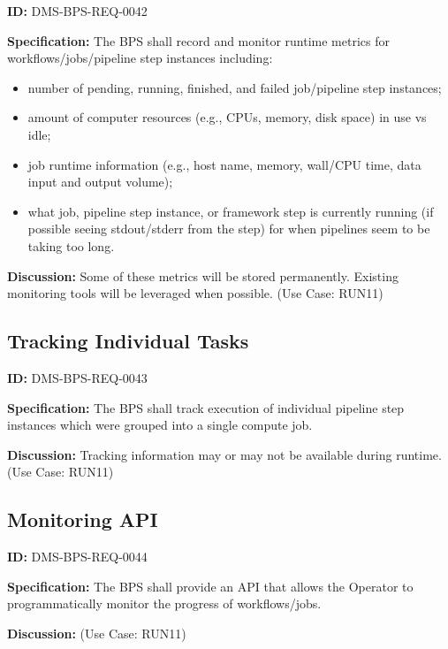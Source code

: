 \documentclass[SE,toc]{lsstdoc}
\begin{document}
\label{DMS-BPS-REQ-0042}
\textbf{ID:} DMS-BPS-REQ-0042

\textbf{Specification:}
The BPS shall record and monitor runtime metrics for workflows/jobs/pipeline step instances including:
\\

    \begin{itemize}
\item
number of pending, running, finished, and failed job/pipeline step instances;

\item
amount of computer resources (e.g., CPUs, memory, disk space) in use vs idle;

\item
job runtime information (e.g., host name, memory, wall/CPU time, data input and output volume);

\item
what job, pipeline step instance, or framework step is currently running (if possible seeing stdout/stderr from the step) for when pipelines seem to be taking too long.

    \end{itemize}

\textbf{Discussion:}
Some of these metrics will be stored permanently. Existing monitoring tools will be leveraged when possible.  (Use Case: RUN11)

\subsection{Tracking Individual Tasks}

\label{DMS-BPS-REQ-0043}
\textbf{ID:} DMS-BPS-REQ-0043

\textbf{Specification:}
The BPS shall track execution of individual pipeline step instances which were grouped into a single compute job.

\textbf{Discussion:}
Tracking information may or may not be available during runtime.  (Use Case: RUN11)

\subsection{Monitoring API}

\label{DMS-BPS-REQ-0044}
\textbf{ID:} DMS-BPS-REQ-0044

\textbf{Specification:}
The BPS shall provide an API that allows the Operator to programmatically monitor the progress of workflows/jobs.

\textbf{Discussion:}
(Use Case: RUN11)
\end{document}
